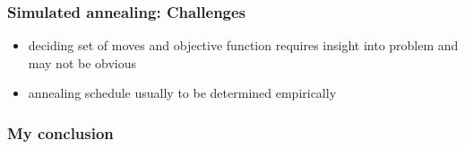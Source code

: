 \documentclass[aspectratio=43]{beamer}
\begin{document}
\begin{frame}
	\frametitle{Simulated annealing: Challenges}
	\begin{center}
		\begin{itemize}
			\item<1-> \alert{deciding set of moves and objective function} requires insight into problem and \alert{may not be obvious}
			\item<1-> \alert{annealing schedule} usually to be determined empirically
		\end{itemize}
	\end{center}
\end{frame}

\begin{frame}
	\frametitle{My conclusion}
	\begin{center}
	\end{center}

\end{frame}


\appendix
\end{document}
